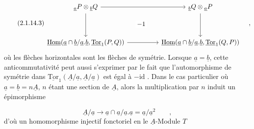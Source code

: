 \begin{equation}\tag{2.1.14.3}
\begin{tikzcd}[column sep=huge, row sep=huge]
{{}_{\underline{a}}P \otimes {}_{\underline{b}}Q} \arrow[r] \arrow[d] \arrow[rd, phantom, "-1" description] & {{}_{\underline{b}}Q \otimes {}_{\underline{a}}P} \arrow[d] \\
{\underline{\mathrm{Hom}}(\underline{a} \cap \underline{b}/\underline{a}.\underline{b},\underline{\mathrm{Tor}}_1(P,Q))} \arrow[r] & {\underline{\mathrm{Hom}}(\underline{a} \cap \underline{b}/\underline{a}.\underline{b},\underline{\mathrm{Tor}}_1(Q,P))}
\end{tikzcd}\quad ,
\end{equation}
où les flèches horizontales sont les flèches de symétrie. Lorsque $\underline{a}=\underline{b}$, cette anticommutativité peut aussi s'exprimer par le fait que l'automorphisme de symétrie dans $\underline{\mathrm{Tor}}_1(\underline{A}/\underline{a},\underline{A}/\underline{a})$ est égal à $-\mathrm{id}$ . Dans le cas particulier où $\underline{a} = \underline{b} = n\underline{A}$, $n$ étant une section de $\underline{A}$, alors la multiplication par $n$ induit un épimorphisme

\begin{equation*}
\underline{A}/\underline{a} \longrightarrow \underline{a} \cap \underline{a}/\underline{a}.\underline{a} = \underline{a}/\underline{a}^2 \qquad ,
\end{equation*}
d'où un homomorphisme injectif fonctoriel en le $\underline{A}$-Module $T$ 


